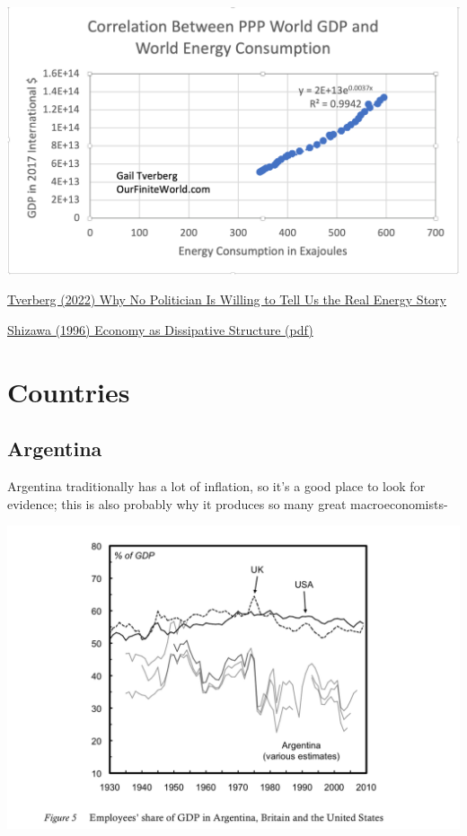 \documentclass[
]{book}
\begin{document}
\includegraphics{fig/world-GDP-and-world-energy-production.png}

\href{https://ourfiniteworld.com/2022/08/23/why-no-politician-is-willing-to-tell-us-the-real-energy-story/}{Tverberg (2022) Why No Politician Is Willing to Tell Us the Real Energy Story}

\href{pdf/Shiozawa_1996_Economy_as_a_Dissipative_Structure.pdf}{Shizawa (1996) Economy as Dissipative Structure (pdf)}

\hypertarget{countries}{%
\chapter{Countries}\label{countries}}

\hypertarget{argentina}{%
\section{Argentina}\label{argentina}}

Argentina traditionally has a lot of inflation,
so it's a good place to look for evidence;
this is also probably why it produces so many great macroeconomists-

\includegraphics{fig/argentina_labour_share.png}
\end{document}

